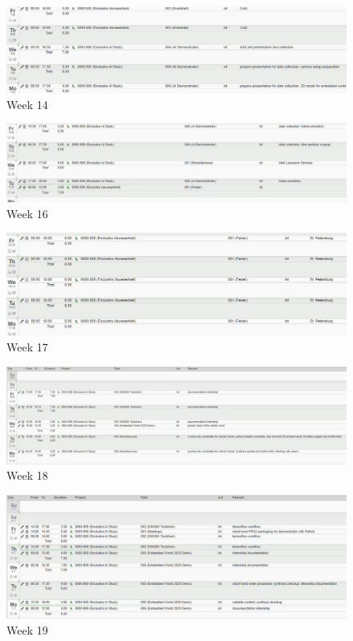 \begin{figure}[!htb]
	\centering
		\includegraphics[width=\textwidth]{timetable/week14.png}
		\caption{Week 14}
\end{figure}

\begin{figure}[!htb]
	\centering
		\includegraphics[width=\textwidth]{timetable/week16.png}
		\caption{Week 16}
\end{figure}

\begin{figure}[!htb]
	\centering
		\includegraphics[width=\textwidth]{timetable/week17.png}
		\caption{Week 17}
\end{figure}

\begin{figure}[!htb]
	\centering
		\includegraphics[width=\textwidth]{timetable/week18.png}
		\caption{Week 18}
\end{figure}

\begin{figure}[!htb]
	\centering
		\includegraphics[width=\textwidth]{timetable/week19.png}
		\caption{Week 19}
\end{figure}

